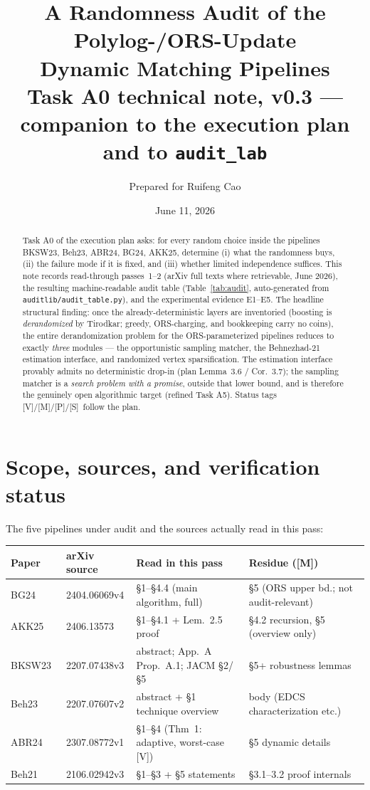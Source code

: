 \documentclass[11pt]{article}
\title{A Randomness Audit of the Polylog-/ORS-Update\\ Dynamic Matching Pipelines\\[2pt]
{\large Task A0 technical note, v0.3 --- companion to the execution plan and to \texttt{audit\_lab}}}
\author{Prepared for Ruifeng Cao}
\date{June 11, 2026}
\newcommand{\statusV}{\textsf{\footnotesize[V]}}
\newcommand{\statusM}{\textsf{\footnotesize[M]}}
\newcommand{\statusP}{\textsf{\footnotesize[P]}}
\newcommand{\statusS}{\textsf{\footnotesize[S]}}
\begin{document}
\maketitle

\begin{abstract}
\noindent Task A0 of the execution plan asks: for every random choice inside the
pipelines BKSW23, Beh23, ABR24, BG24, AKK25, determine (i) what the randomness
buys, (ii) the failure mode if it is fixed, and (iii) whether limited
independence suffices. This note records read-through passes~1--2 (arXiv full texts
where retrievable, June 2026), the resulting machine-readable audit table
(Table~\ref{tab:audit}, auto-generated from \texttt{auditlib/audit\_table.py}),
and the experimental evidence E1--E5. The headline structural finding: once
the already-deterministic layers are inventoried (boosting is
\emph{derandomized} by Tirodkar; greedy, ORS-charging, and bookkeeping carry
no coins), the entire derandomization problem for the ORS-parameterized
pipelines reduces to exactly \emph{three} modules --- the opportunistic
sampling matcher, the Behnezhad-21 estimation interface, and randomized vertex
sparsification. The estimation interface provably admits no deterministic
drop-in (plan Lemma~3.6 / Cor.~3.7); the sampling matcher is a \emph{search
problem with a promise}, outside that lower bound, and is therefore the
genuinely open algorithmic target (refined Task A5). Status tags
\statusV/\statusM/\statusP/\statusS\ follow the plan.
\end{abstract}

\section{Scope, sources, and verification status}\label{sec:scope}

The five pipelines under audit and the sources actually read in this pass:

\begin{center}\footnotesize
\begin{tabular}{@{}llll@{}}
\toprule
Paper & arXiv source & Read in this pass & Residue (\statusM) \\
\midrule
BG24~\cite{BG24}   & 2404.06069v4 & \S1--\S4.4 (main algorithm, full) & \S5 (ORS upper bd.; not audit-relevant) \\
AKK25~\cite{AKK25} & 2406.13573   & \S1--\S4.1 + Lem.~2.5 proof       & \S4.2 recursion, \S5 (overview only) \\
BKSW23~\cite{BKSW23}& 2207.07438v3 & abstract; App.~A Prop.~A.1; JACM \S2/\S5 & \S5+ robustness lemmas \\
Beh23~\cite{Beh23}  & 2207.07607v2 & abstract + \S1 technique overview & body (EDCS characterization etc.) \\
ABR24~\cite{ABR24}  & 2307.08772v1 & \S1--\S4 (Thm~1: adaptive, worst-case \statusV) & \S5 dynamic details \\
Beh21~\cite{Beh21}  & 2106.02942v3 & \S1--\S3 + \S5 statements & \S3.1--3.2 proof internals \\
\bottomrule
\end{tabular}
\end{center}
\end{document}
